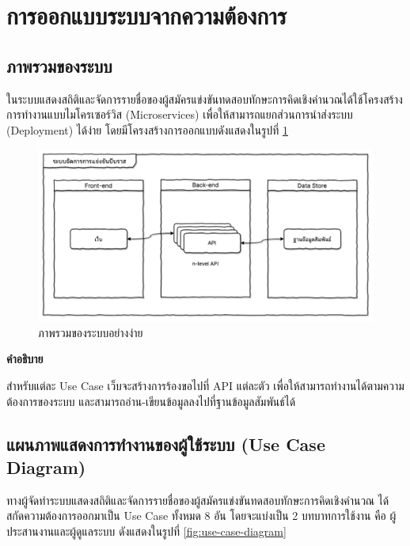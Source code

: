 \newpage

\section{การออกแบบระบบจากความต้องการ}
\subsection{ภาพรวมของระบบ}

ในระบบแสดงสถิติและจัดการรายชื่อของผู้สมัครแข่งขันทดสอบทักษะการคิดเชิงคำนวณได้ใช้โครงสร้างการทำงานแบบไมโครเซอร์วิส (Microservices) \cite{WhatAreMicroservices} เพื่อให้สามารถแยกส่วนการนำส่งระบบ (Deployment) ได้ง่าย โดยมีโครงสร้างการออกแบบดังแสดงในรูปที่ \ref{fig:simplified-system-overview-diagram}

\begin{figure}[H]
    \centering
    \includegraphics[width=125mm,scale=1.0]{diagrams/simplified-system-overview-diagram.png}
    \caption{ภาพรวมของระบบอย่างง่าย}
    \label{fig:simplified-system-overview-diagram}
\end{figure}

\textbf{คำอธิบาย}

สำหรับแต่ละ Use Case เว็บจะสร้างการร้องขอไปที่ API แต่ละตัว เพื่อให้สามารถทำงานได้ตามความต้องการของระบบ และสามารถอ่าน-เขียนข้อมูลลงไปที่ฐานข้อมูลสัมพันธ์ได้

\subsection{แผนภาพแสดงการทำงานของผู้ใช้ระบบ (Use Case Diagram)}

ทางผู้จัดทำระบบแสดงสถิติและจัดการรายชื่อของผู้สมัครแข่งขันทดสอบทักษะการคิดเชิงคำนวณ ได้สกัดความต้องการออกมาเป็น Use Case ทั้งหมด 8 อัน โดยจะแบ่งเป็น 2 บทบาทการใช้งาน คือ ผู้ประสานงานและผู้ดูแลระบบ ดังแสดงในรูปที่ \ref{fig:use-case-diagram}

